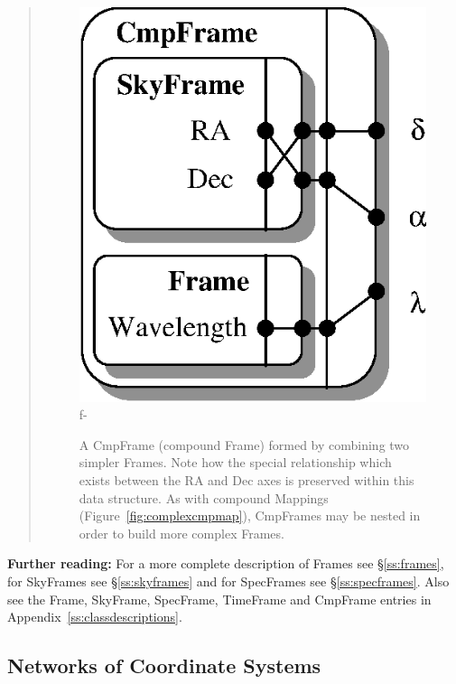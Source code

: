 \documentclass[twoside,11pt]{article}
\newcommand{\appref}[1]{Appendix~\ref{#1}}
\newcommand{\secref}[1]{\S\ref{#1}}
\newcommand{\appref}[1]{\ref{#1}}
\newcommand{\secref}[1]{\ref{#1}}
\begin{document}
\begin{htmlonly}
\begin{quote}
\begin{figure}
   \includegraphics[scale=1.5]{sun210_figures/cmpframe.eps}
f-
   \caption{A CmpFrame (compound Frame) formed by combining two simpler
   Frames. Note how the special relationship which exists between the RA
   and Dec axes is preserved within this data structure. As with compound
   Mappings (Figure~\ref{fig:complexcmpmap}), CmpFrames may be nested in
   order to build more complex Frames.}
   \end{figure}
   \end{quote}
\end{htmlonly}

{\bf{Further reading:}} For a more complete description of Frames see
\secref{ss:frames}, for SkyFrames see \secref{ss:skyframes} and for
SpecFrames see \secref{ss:specframes}.  Also see the Frame, SkyFrame,
SpecFrame, TimeFrame and CmpFrame entries in \appref{ss:classdescriptions}.

\subsection{Networks of Coordinate Systems}
\end{document}
